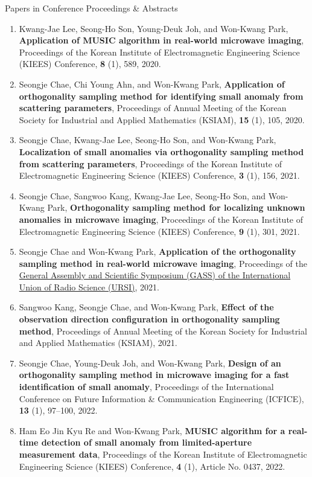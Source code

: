\documentclass{resume} %
\begin{document}
\begin{rSection}{Papers in Conference Proceedings \& Abstracts}
\begin{enumerate}
\item\label{C-KIEES2020} Kwang-Jae Lee, Seong-Ho Son, Young-Deuk Joh, and Won-Kwang Park, \textbf{Application of MUSIC algorithm in real-world microwave imaging}, Proceedings of the Korean Institute of Electromagnetic Engineering Science (KIEES) Conference, \textbf{8} (1), 589, 2020.
\item\label{C-KSIAM2020} Seongje Chae, Chi Young Ahn, and Won-Kwang Park, \textbf{Application of orthogonality sampling method for identifying small anomaly from scattering parameters}, Proceedings of Annual Meeting of the Korean Society for Industrial and Applied Mathematics (KSIAM), \textbf{15} (1), 105, 2020.
\item\label{C-KIEES2021A} Seongje Chae, Kwang-Jae Lee, Seong-Ho Son, and Won-Kwang Park, \textbf{Localization of small anomalies via orthogonality sampling method from scattering parameters}, Proceedings of the Korean Institute of Electromagnetic Engineering Science (KIEES) Conference, \textbf{3} (1), 156, 2021.
\item\label{C-KIEES2021B} Seongje Chae, Sangwoo Kang, Kwang-Jae Lee, Seong-Ho Son, and Won-Kwang Park, \textbf{Orthogonality sampling method for localizing unknown anomalies in microwave imaging}, Proceedings of the Korean Institute of Electromagnetic Engineering Science (KIEES) Conference, \textbf{9} (1), 301, 2021.
\item\label{C-URSI2021} Seongje Chae and Won-Kwang Park, \textbf{Application of the orthogonality sampling method in real-world microwave imaging}, Proceedings of the \href{https://www.ursi2021.org}{ General Assembly and Scientific Symposium (GASS) of the International Union of Radio Science (URSI)}, 2021.
\item\label{C-KSIAM2021} Sangwoo Kang, Seongje Chae, and Won-Kwang Park, \textbf{Effect of the observation direction configuration in orthogonality sampling method}, Proceedings of Annual Meeting of the Korean Society for Industrial and Applied Mathematics (KSIAM), 2021.
\item\label{C-ICFICE2022} Seongje Chae, Young-Deuk Joh, and Won-Kwang Park, \textbf{Design of an orthogonality sampling method in microwave imaging for a fast identification of small anomaly}, Proceedings of the  International Conference on Future Information \& Communication Engineering (ICFICE), \textbf{13} (1), 97--100, 2022.
\item\label{C-KIEES2022A} Ham Eo Jin Kyu Re and Won-Kwang Park, \textbf{MUSIC algorithm for a real-time detection of small anomaly from limited-aperture measurement data}, Proceedings of the Korean Institute of Electromagnetic Engineering Science (KIEES) Conference, \textbf{4} (1), Article No. 0437, 2022.

\end{enumerate}
\end{rSection}
\end{document}
